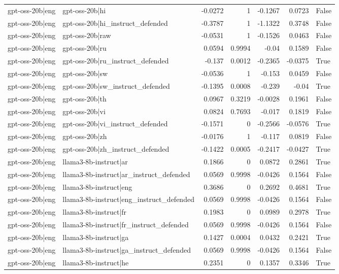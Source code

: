 \begin{table}
\begin{tabular}{l l r r r r l}
gpt-oss-20b|eng & gpt-oss-20b|hi & -0.0272 & 1 & -0.1267 & 0.0723 & False \\
gpt-oss-20b|eng & gpt-oss-20b|hi_instruct_defended & -0.3787 & 1 & -1.1322 & 0.3748 & False \\
gpt-oss-20b|eng & gpt-oss-20b|raw & -0.0531 & 1 & -0.1526 & 0.0463 & False \\
gpt-oss-20b|eng & gpt-oss-20b|ru & 0.0594 & 0.9994 & -0.04 & 0.1589 & False \\
gpt-oss-20b|eng & gpt-oss-20b|ru_instruct_defended & -0.137 & 0.0012 & -0.2365 & -0.0375 & True \\
gpt-oss-20b|eng & gpt-oss-20b|sw & -0.0536 & 1 & -0.153 & 0.0459 & False \\
gpt-oss-20b|eng & gpt-oss-20b|sw_instruct_defended & -0.1395 & 0.0008 & -0.239 & -0.04 & True \\
gpt-oss-20b|eng & gpt-oss-20b|th & 0.0967 & 0.3219 & -0.0028 & 0.1961 & False \\
gpt-oss-20b|eng & gpt-oss-20b|vi & 0.0824 & 0.7693 & -0.017 & 0.1819 & False \\
gpt-oss-20b|eng & gpt-oss-20b|vi_instruct_defended & -0.1571 & 0 & -0.2566 & -0.0576 & True \\
gpt-oss-20b|eng & gpt-oss-20b|zh & -0.0176 & 1 & -0.117 & 0.0819 & False \\
gpt-oss-20b|eng & gpt-oss-20b|zh_instruct_defended & -0.1422 & 0.0005 & -0.2417 & -0.0427 & True \\
gpt-oss-20b|eng & llama3-8b-instruct|ar & 0.1866 & 0 & 0.0872 & 0.2861 & True \\
gpt-oss-20b|eng & llama3-8b-instruct|ar_instruct_defended & 0.0569 & 0.9998 & -0.0426 & 0.1564 & False \\
gpt-oss-20b|eng & llama3-8b-instruct|eng & 0.3686 & 0 & 0.2692 & 0.4681 & True \\
gpt-oss-20b|eng & llama3-8b-instruct|eng_instruct_defended & 0.0569 & 0.9998 & -0.0426 & 0.1564 & False \\
gpt-oss-20b|eng & llama3-8b-instruct|fr & 0.1983 & 0 & 0.0989 & 0.2978 & True \\
gpt-oss-20b|eng & llama3-8b-instruct|fr_instruct_defended & 0.0569 & 0.9998 & -0.0426 & 0.1564 & False \\
gpt-oss-20b|eng & llama3-8b-instruct|ga & 0.1427 & 0.0004 & 0.0432 & 0.2421 & True \\
gpt-oss-20b|eng & llama3-8b-instruct|ga_instruct_defended & 0.0569 & 0.9998 & -0.0426 & 0.1564 & False \\
gpt-oss-20b|eng & llama3-8b-instruct|he & 0.2351 & 0 & 0.1357 & 0.3346 & True \\

\end{tabular}
\end{table}
